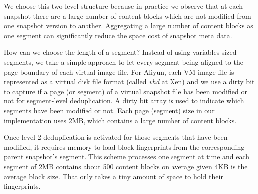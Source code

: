 We choose this two-level structure because in practice we observe that at each snapshot there are a large
number of content blocks which are not modified from one snapshot version to another.
Aggregating a large number of content blocks as one segment can significantly
reduce the space cost of snapshot meta data. 

How can we choose the length of a segment?
Instead of using variables-sized segments, we take a simple approach
to let every segment being aligned to the page boundary of each virtual image file.
For Aliyun, each VM image file is represented as a virtual disk file format
(called \emph{vhd} at Xen) and we use a dirty bit to capture if a page (or segment) of a virtual snapshot file 
has been modified or not for segment-level deduplication.
A dirty bit array is used to indicate which segments have been modified or not. 
Each page (segment) size in our implementation uses 2MB, which contains a large number of content blocks.






Once level-2 deduplication is activated for those segments that have been modified,
it requires memory to load  block fingerprints from the corresponding
parent snapshot's segment.
This scheme processes one segment at time and each segment of 2MB contains about 
500 content blocks on average given 4KB is the average block size.
That only takes a tiny amount of space to hold their fingerprints.

